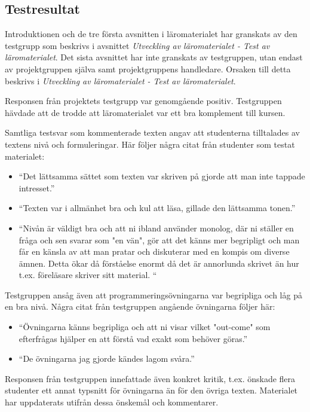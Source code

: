 \documentclass[]{article}
\begin{document}
\subsection{Testresultat}
Introduktionen och de tre första avsnitten i läromaterialet har granskats av den testgrupp som beskrivs i avsnittet
\textit{Utveckling av läromaterialet - Test av läromaterialet}. Det sista avsnittet har inte granskats av testgruppen,
utan endast av projektgruppen själva samt projektgruppens handledare. Orsaken till detta beskrivs i
\textit{Utveckling av läromaterialet - Test av läromaterialet}.

Responsen från projektets testgrupp var genomgående positiv. Testgruppen hävdade att de trodde att läromaterialet var
ett bra komplement till kursen.

Samtliga testsvar som kommenterade texten angav att studenterna tilltalades av textens nivå och formuleringar. Här
följer några citat från studenter som testat materialet:
\begin{itemize}
  \item “Det lättsamma sättet som texten var skriven på gjorde att man inte tappade intresset.”
  \item “Texten var i allmänhet bra och kul att läsa, gillade den lättsamma tonen.”
  \item “Nivån är väldigt bra och att ni ibland använder monolog, där ni ställer en fråga och sen svarar som "en vän",
  gör att det känns mer begripligt och man får en känsla av att man pratar och diskuterar med en kompis om diverse ämnen.
  Detta ökar då förståelse enormt då det är annorlunda skrivet än hur t.ex. föreläsare skriver sitt material. “
\end{itemize}

Testgruppen ansåg även att programmeringsövningarna var begripliga och låg på en bra nivå. Några citat från testgruppen
angående övningarna följer här:
\begin{itemize}
  \item “Övningarna känns begripliga och att ni visar vilket "out-come" som efterfrågas hjälper en att förstå vad
  exakt som behöver göras.”
  \item “De övningarna jag gjorde kändes lagom svåra.”
  \end{itemize}

Responsen från testgruppen innefattade även konkret kritik, t.ex. önskade flera studenter ett annat typsnitt för
övningarna än för den övriga texten. Materialet har uppdaterats utifrån dessa önskemål och kommentarer.
\end{document}
